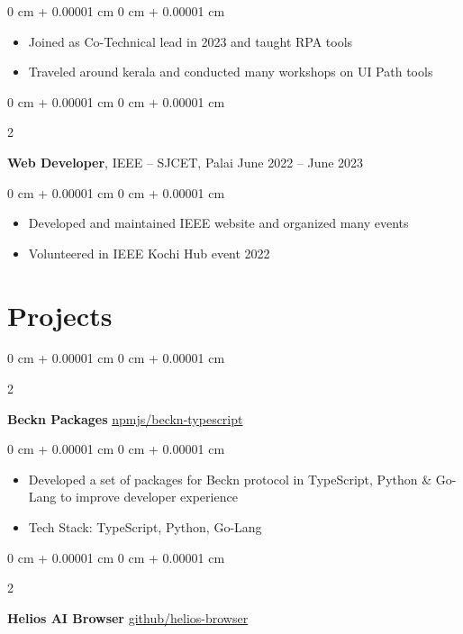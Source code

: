 \documentclass[10pt, letterpaper]{article}
\newenvironment{highlights}{
    \begin{itemize}[
        topsep=0.10 cm,
        parsep=0.10 cm,
        partopsep=0pt,
        itemsep=0pt,
        leftmargin=0 cm + 10pt
    ]
}{
    \end{itemize}
} %
\newenvironment{onecolentry}{
    \begin{adjustwidth}{
        0 cm + 0.00001 cm
    }{
        0 cm + 0.00001 cm
    }
}{
    \end{adjustwidth}
} %
\newenvironment{twocolentry}[2][]{
    \onecolentry
    \def\secondColumn{#2}
    \setcolumnwidth{\fill, 4.5 cm}
    \begin{paracol}{2}
}{
    \switchcolumn \raggedleft \secondColumn
    \end{paracol}
    \endonecolentry
} %
\begin{document}
\vspace{0.10 cm}
\begin{onecolentry}
	\begin{highlights}
		\item Joined as Co-Technical lead in 2023 and taught RPA tools
		\item Traveled around kerala and conducted many workshops on UI Path tools
	\end{highlights}
\end{onecolentry}

\vspace{0.2 cm}

\begin{twocolentry}{
		June 2022 – June 2023
	}
	\textbf{Web Developer}, IEEE -- SJCET, Palai\end{twocolentry}

\vspace{0.10 cm}
\begin{onecolentry}
	\begin{highlights}
		\item Developed and maintained IEEE website and organized many events
		\item Volunteered in IEEE Kochi Hub event 2022
	\end{highlights}
\end{onecolentry}

\section{Projects}

\begin{twocolentry}{
		\href{https://github.com/rajatsandeepsen/beckn-typescript}{npmjs/beckn-typescript}
	}
	\textbf{Beckn Packages}\end{twocolentry}

\vspace{0.10 cm}
\begin{onecolentry}
	\begin{highlights}
		\item Developed a set of packages for Beckn protocol in TypeScript, Python \& Go-Lang
		to improve developer experience
		\item Tech Stack: TypeScript, Python, Go-Lang
	\end{highlights}
\end{onecolentry}

\vspace{0.2 cm}

\begin{twocolentry}{
		\href{https://github.com/Milansuman/Helios-Browser}{github/helios-browser}
	}
	\textbf{Helios AI Browser}\end{twocolentry}
\end{document}
